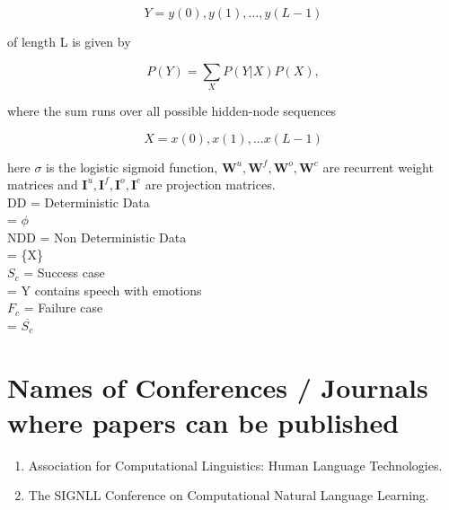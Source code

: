 \documentclass[oneside,a4paper,12pt]{book}
\begin{document}
\begin{equation}
Y = y(0),y(1),...,y(L-1)
\end{equation}

of length L is given by\

\begin{equation}
P(Y) = \displaystyle\sum_{X} P(Y|X)P(X),
\end{equation}

where the sum runs over all possible hidden-node sequences\

\begin{equation}
X = x(0),x(1),...x(L-1)
\end{equation}


here $\sigma$ is the logistic sigmoid function, $\mathbf W^u, \mathbf W^f, \mathbf W^o, \mathbf W^c$ are recurrent weight matrices and $\mathbf I^u, \mathbf I^f, \mathbf I^o, \mathbf I^c$ are projection matrices.
\\
DD = Deterministic Data\\
\hspace*{20pt}= $\phi$ \\
NDD = Non Deterministic Data\\
\hspace*{30pt} = \{X\}\\
$S_{c}$ = Success case\\
\hspace*{10pt} = Y contains speech with emotions\\
$F_{c}$ = Failure case\\
\hspace*{10pt} = $\overline{S_{c}}$



\section{Names of Conferences / Journals where papers can be published}
\begin{enumerate}
\item Association for Computational Linguistics: Human Language Technologies.
\item The SIGNLL Conference on Computational Natural Language Learning.
\end{enumerate}
\end{document}

